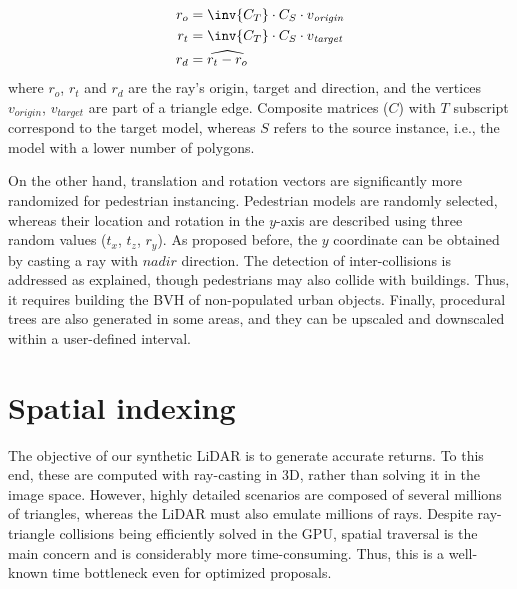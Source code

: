 \begin{gather}
    \label{eq:mesh_collision_ray}
    \begin{aligned}
        r_{o} &= \inv{C_{T}} \cdot C_{S} \cdot v_{\textit{origin}}\\
        r_{t} &= \inv{C_{T}} \cdot C_{S} \cdot v_{\textit{target}}\\
        r_{d} &= \widehat{r_{t} - r_{o}}
    \end{aligned}
\end{gather}
where $r_{o}$, $r_{t}$ and $r_{d}$ are the ray's origin, target and direction, and the vertices $v_{\textit{origin}}$, $v_{\textit{target}}$ are part of a triangle edge. Composite matrices ($C$) with $T$ subscript correspond to the target model, whereas $S$ refers to the source instance, i.e., the model with a lower number of polygons.

On the other hand, translation and rotation vectors are significantly more randomized for pedestrian instancing. Pedestrian models are randomly selected, whereas their location and rotation in the $y$-axis are described using three random values ($t_x$, $t_z$, $r_y$). As proposed before, the $y$ coordinate can be obtained by casting a ray with $\textit{nadir}$ direction. The detection of inter-collisions is addressed as explained, though pedestrians may also collide with buildings. Thus, it requires building the BVH of non-populated urban objects. Finally, procedural trees are also generated in some areas, and they can be upscaled and downscaled within a user-defined interval.

\section{Spatial indexing}

The objective of our synthetic LiDAR is to generate accurate returns. To this end, these are computed with ray-casting in 3D, rather than solving it in the image space. However, highly detailed scenarios are composed of several millions of triangles, whereas the LiDAR must also emulate millions of rays. Despite ray-triangle collisions being efficiently solved in the GPU, spatial traversal is the main concern and is considerably more time-consuming. Thus, this is a well-known time bottleneck even for optimized proposals. 

